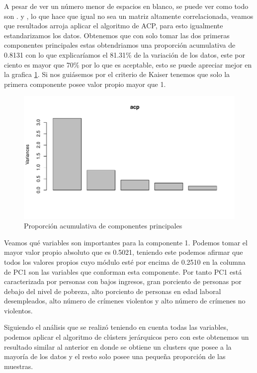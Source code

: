 \documentclass[a4paper,10pt,twocolumn]{article}
\begin{document}
	A pesar de ver un número menor de espacios en blanco, se puede ver como todo son . y , lo que hace que igual no sea un matriz altamente correlacionada, veamos que resultados arroja aplicar el algoritmo de ACP, para esto igualmente estandarizamos los datos. Obtenemos que con solo tomar las dos primeras componentes principales estas obtendriamos una proporción acumulativa de 0.8131 con lo que explicaríamos el 81.31\% de la variación de los datos, este por ciento es mayor que 70\% por lo que es aceptable, esto se puede apreciar mejor en la grafica \ref{fig:acp_2}. Si nos guiásemos por el criterio de Kaiser tenemos que solo la primera componente posee valor propio mayor que 1.

	\begin{figure}[htb]
		\begin{center}
			\includegraphics[width=\columnwidth]{figures/acp_2.pdf}
		\end{center}
		\caption{Proporción acumulativa de componentes principales\label{fig:acp_2}}%
	\end{figure}

	Veamos qué variables son importantes para la componente 1. Podemos tomar el mayor valor propio absoluto que es 0.5021, teniendo este podemos afirmar que todos los valores propios cuyo módulo esté por encima de 0.2510 en la columna de PC1 son las variables que conforman esta componente. Por tanto PC1 está caracterizada por personas con bajos ingresos, gran porciento de personas por debajo del nivel de pobreza, alto porciento de personas en edad laboral desempleados, alto número de crímenes violentos y alto número de crímenes no violentos.

	Siguiendo el análisis que se realizó teniendo en cuenta todas las variables, podemos aplicar el algoritmo de clústers jerárquicos pero con este obtenemos un resultado similar al anterior en donde se obtiene un clusters que posee a la mayoría de los datos y el resto solo posee una pequeña proporción de las muestras.
\end{document}
